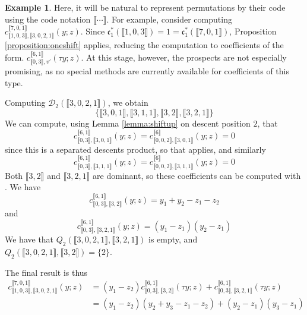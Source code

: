 \documentclass[reqno]{amsart}
\theoremstyle{definition}
\newtheorem{example}[lemma]{Example}
\theoremstyle{remark}
\numberwithin{equation}{subsection}
\newcommand{\cperm}[1]{\llbracket #1\rrbracket}
\newcommand{\shifthom}{\tau}
\newcommand{\shiftvby}[1]{\shifthom^{#1}}
\newcommand{\code}{\mathfrak{c}}
\begin{document}
\begin{example} \label{example:pieces}
	Here, it will be natural to represent permutations by their code using the code notation $\cperm{\cdots}$. For example, consider computing $c_{\cperm{1,0,3},\cperm{3,0,2,1}}^{\cperm{7,0,1}}(y;z)$. Since $\code_1^*(\cperm{1,0,3}) = 1=\code_1^*(\cperm{7,0,1})$, Proposition \ref{proposition:oneshift} applies, reducing the computation to coefficients of the form. $c_{\cperm{0,3},v'}^{\cperm{6,1}}(\shifthom y;z)$. At this stage, however, the prospects are not especially promising, as no special methods are currently available for coefficients of this type.
	
	
	Computing $\mathcal{D}_2(\cperm{3,0,2,1})$, we obtain
	$$\{\cperm{3,0,1},\cperm{3,1,1},\cperm{3,2},\cperm{3,2,1}\}$$
	We can compute, using Lemma \ref{lemma:shiftup} on descent position $2$, that
	$$c_{\cperm{0,3},\cperm{3,0,1}}^{\cperm{6,1}}(y;z)=c_{\cperm{0,0,2},\cperm{3,0,1}}^{\cperm{6}}(y;z)=0$$
	since this is a separated descents product, so that \cite[Theorem~3.1]{samuelmolev} applies, and similarly
	$$c_{\cperm{0,3},\cperm{3,1,1}}^{\cperm{6,1}}(y;z)=c_{\cperm{0,0,2},\cperm{3,1,1}}^{\cperm{6}}(y;z)=0$$	
	Both $\cperm{3,2}$ and $\cperm{3,2,1}$ are dominant, so these coefficients can be computed with \cite[Theorem~8.1]{samuelmolev}. We have
	$$c_{\cperm{0,3},\cperm{3,2}}^{\cperm{6,1}}(y;z) = y_1 + y_2 - z_1 - z_2$$
	and
	$$c_{\cperm{0,3},\cperm{3,2,1}}^{\cperm{6,1}}(y;z)=(y_1 - z_1) (y_2 - z_1)$$
	We have that $Q_2(\cperm{3,0,2,1},\cperm{3,2,1})$ is empty, and $Q_2(\cperm{3,0,2,1},\cperm{3,2})=\{2\}$.
	
	The final result is thus
	\begin{align*}
	c_{\cperm{1,0,3},\cperm{3,0,2,1}}^{\cperm{7,0,1}}(y;z)&=(y_1-z_2)c_{\cperm{0,3},\cperm{3,2}}^{\cperm{6,1}}(\shifthom y;z) + c_{\cperm{0,3},\cperm{3,2,1}}^{\cperm{6,1}}(\shifthom y;z)\\
	&=(y_1-z_2)(y_2+y_3-z_1-z_2)+(y_2-z_1)(y_3-z_1)
	\end{align*}
	
\end{example}
\end{document}
